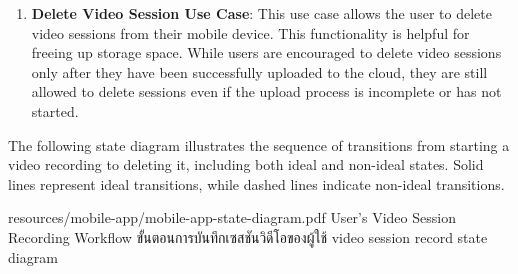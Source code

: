 \begin{enumerate}
    \item \textbf{Delete Video Session Use Case}: This use case allows the user to delete video sessions from their mobile device. This functionality is helpful for freeing up storage space. While users are encouraged to delete video sessions only after they have been successfully uploaded to the cloud, they are still allowed to delete sessions even if the upload process is incomplete or has not started.  
\end{enumerate}
The following state diagram illustrates the sequence of transitions from starting a video recording to deleting it, including both ideal and non-ideal states. Solid lines represent ideal transitions, while dashed lines indicate non-ideal transitions.

\insertPDFfigure
{resources/mobile-app/mobile-app-state-diagram.pdf}
{\ifenglish User's Video Session Recording Workflow \else ขั้นตอนการบันทึกเซสชันวิดีโอของผู้ใช้ \fi}
{video session record state diagram}